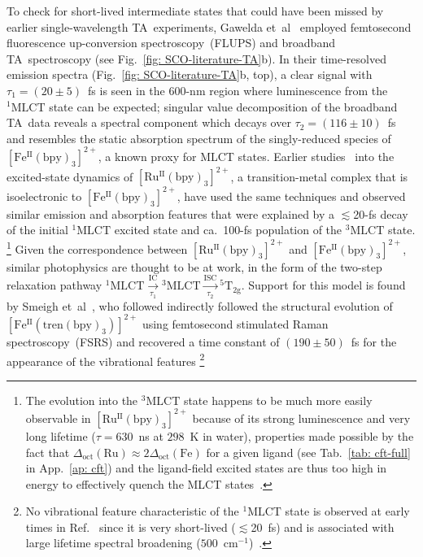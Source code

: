 To check for short-lived intermediate states that could have been missed by
earlier single-wavelength TA~experiments,
Gawelda et~al~\cite{Gawelda2007a} employed
femtosecond fluorescence up-conversion spectroscopy~(FLUPS)
and broadband TA~spectroscopy (see Fig.~\ref{fig: SCO-literature-TA}b).
%
In their time-resolved emission spectra (Fig.~\ref{fig: SCO-literature-TA}b, top),
a clear signal with $\tau_1 = (20 \pm 5)$~fs is seen in the 600-nm region
where luminescence from the $\mathrm{^1 MLCT}$ state can be expected;
singular value decomposition of the broadband TA~data reveals
a spectral component which decays over $\tau_2 = (116 \pm 10)$~fs and resembles
the static absorption spectrum of the singly-reduced species of $\mathrm{[Fe^{II}(bpy)_3]^{2+}}$,
a known proxy for MLCT states.
%
Earlier studies~\cite{Damrauer1997, Yeh2000, Cannizzo2006}
into the excited-state dynamics of $\mathrm{[Ru^{II}(bpy)_3]^{2+}}$,
a transition-metal complex that is isoelectronic to $\mathrm{[Fe^{II}(bpy)_3]^{2+}}$,
have used the same techniques and
observed similar emission and absorption features that were explained by
a $\lesssim$20-fs decay of the initial $\mathrm{^1 MLCT}$ excited state
and ca.~100-fs population of the $\mathrm{^3 MLCT}$ state.%
\footnote{The evolution into the $\mathrm{^3 MLCT}$ state happens to be much more easily observable
in $\mathrm{[Ru^{II}(bpy)_3]^{2+}}$ because of its strong luminescence
and very long lifetime ($\tau = 630$~ns at $298$~K in water),
properties made possible by the fact that
$\Delta_\text{oct}(\text{Ru}) \approx 2 \Delta_\text{oct}(\text{Fe})$
for a given ligand (see Tab.~\ref{tab: cft-full} in App.~\ref{ap: cft})
and the ligand-field excited states are thus too high in energy to effectively
quench the MLCT states~\cite{Thompson2013, Hauser2017}.}
Given the correspondence between $\mathrm{[Ru^{II}(bpy)_3]^{2+}}$ and $\mathrm{[Fe^{II}(bpy)_3]^{2+}}$, similar photophysics are thought to be at work,
in the form of the two-step relaxation pathway
$\mathrm{^1 MLCT} \xrightarrow[\tau_1]{\text{IC}} \mathrm{^3 MLCT}
\xrightarrow[\tau_2]{\text{ISC}} \mathrm{^5 T_{2g}}$.
%
Support for this model is found by Smeigh et~al~\cite{Smeigh2008},
who followed indirectly followed the structural evolution of $\mathrm{[Fe^{II}(tren(bpy)_3)]^{2+}}$
using femtosecond stimulated Raman spectroscopy~(FSRS) and
recovered a time constant of $(190 \pm 50)$~fs
for the appearance of the vibrational features%
\footnote{No vibrational feature characteristic of the $\mathrm{^1 MLCT}$ state
is observed at early times in Ref.~\cite{Smeigh2008}
since it is very short-lived ($\lesssim$20~fs) and is associated
with large lifetime spectral broadening ($500$~cm$^{-1}$)~\cite{Kukura2007}.}
